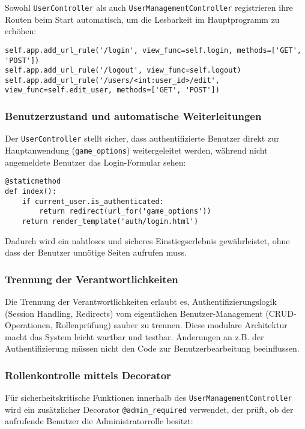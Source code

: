 \documentclass[12pt]{article}
\begin{document}
Sowohl \texttt{UserController} als auch \texttt{UserManagementController} registrieren ihre Routen beim Start automatisch, um die Lesbarkeit im Hauptprogramm zu erhöhen:

\begin{verbatim}
self.app.add_url_rule('/login', view_func=self.login, methods=['GET', 'POST'])
self.app.add_url_rule('/logout', view_func=self.logout)
self.app.add_url_rule('/users/<int:user_id>/edit', view_func=self.edit_user, methods=['GET', 'POST'])
\end{verbatim}

\newpage
\subsubsection*{Benutzerzustand und automatische Weiterleitungen}

Der \texttt{UserController} stellt sicher, dass authentifizierte Benutzer direkt zur Hauptanwendung (\texttt{game\_options}) weitergeleitet werden, während nicht angemeldete Benutzer das Login-Formular sehen:

\begin{verbatim}
@staticmethod
def index():
    if current_user.is_authenticated:
        return redirect(url_for('game_options'))
    return render_template('auth/login.html')
\end{verbatim}

\noindent Dadurch wird ein nahtloses und sicheres Einstiegserlebnis gewährleistet, ohne dass der Benutzer unnötige Seiten aufrufen muss.

\subsubsection*{Trennung der Verantwortlichkeiten}

Die Trennung der Verantwortlichkeiten erlaubt es, Authentifizierungslogik (Session Handling, Redirects) vom eigentlichen Benutzer-Management (CRUD-Operationen, Rollenprüfung) sauber zu trennen. Diese modulare Architektur macht das System leicht wartbar und testbar. Änderungen an z.B. der Authentifizierung müssen nicht den Code zur Benutzerbearbeitung beeinflussen.

\subsubsection*{Rollenkontrolle mittels Decorator}

Für sicherheitskritische Funktionen innerhalb des \texttt{UserManagementController} wird ein zusätzlicher Decorator \texttt{@admin\_required} verwendet, der prüft, ob der aufrufende Benutzer die Administratorrolle besitzt:
\end{document}
